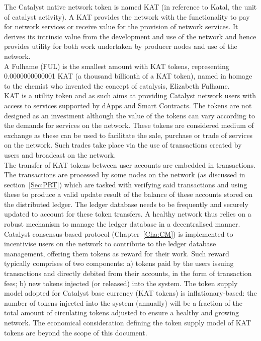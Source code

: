 The Catalyst native network token is named KAT (in reference to Katal, the unit of catalyst activity). A KAT provides the network with the functionality to pay for network services or receive value for the provision of network services. It derives its intrinsic value from the development and use of the network and hence provides utility for both work undertaken by producer nodes and use of the network. \\

A Fulhame (FUL) is the smallest amount with KAT tokens, representing 0.0000000000001 KAT (a thousand billionth of a KAT token), named in homage to the chemist who invented the concept of catalysis, Elizabeth Fulhame.\\

KAT is a utility token and as such aims at providing Catalyst network users with access to services supported by dApps and Smart Contracts. The tokens are not designed as an investment although the value of the tokens can vary according to the demands for services on the network. These tokens are considered medium of exchange as these can be used to facilitate the sale, purchase or trade of services on the network. Such trades take place via the use of transactions created by users and broadcast on the network. \\

The transfer of KAT tokens between user accounts are embedded in transactions. The transactions are processed by some nodes on the network (as discussed in section~\ref{Sec:PRT}) which are tasked with verifying said transactions and using these to produce a valid update result of the balance of these accounts stored on the distributed ledger. The ledger database needs to be frequently and securely updated to account for these token transfers. A healthy network thus relies on a robust mechanism to manage the ledger database in a decentralised manner. Catalyst consensus-based protocol (Chapter~\ref{Cha:CM}) is implemented to incentivise users on the network to contribute to the ledger database management, offering them tokens as reward for their work. Such reward typically comprises of two components: a) tokens paid by the users issuing transactions and directly debited from their accounts, in the form of transaction fees; b) new tokens injected (or released) into the system. The token supply model adopted for Catalyst base currency (KAT tokens) is inflationary-based: the number of tokens injected into the system (annually) will be a fraction of the total amount of circulating tokens adjusted to ensure a healthy and growing network. The economical consideration defining the token supply model of KAT tokens are beyond the scope of this document. 
